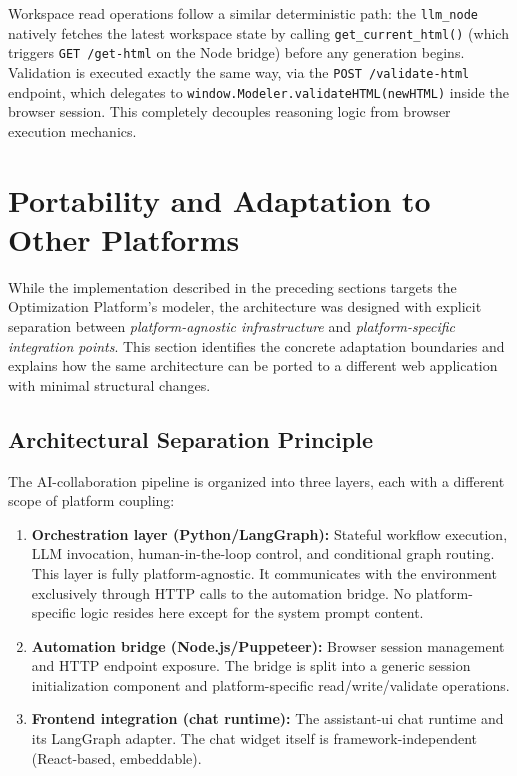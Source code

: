 Workspace read operations follow a similar deterministic path: the \texttt{llm\_node} natively fetches the latest workspace state by calling \texttt{get\_current\_html()} (which triggers \texttt{GET /get-html} on the Node bridge) before any generation begins. Validation is executed exactly the same way, via the \texttt{POST /validate-html} endpoint, which delegates to \texttt{window.Modeler.validateHTML(newHTML)} inside the browser session. This completely decouples reasoning logic from browser execution mechanics.


\section{Portability and Adaptation to Other Platforms}
While the implementation described in the preceding sections targets the Optimization Platform's modeler, the architecture was designed with explicit separation between \emph{platform-agnostic infrastructure} and \emph{platform-specific integration points}. This section identifies the concrete adaptation boundaries and explains how the same architecture can be ported to a different web application with minimal structural changes.

\subsection{Architectural Separation Principle}
The AI-collaboration pipeline is organized into three layers, each with a different scope of platform coupling:

\begin{enumerate}
    \item \textbf{Orchestration layer (Python/LangGraph):} Stateful workflow execution, LLM invocation, human-in-the-loop control, and conditional graph routing. This layer is fully platform-agnostic. It communicates with the environment exclusively through HTTP calls to the automation bridge. No platform-specific logic resides here except for the system prompt content.
    \item \textbf{Automation bridge (Node.js/Puppeteer):} Browser session management and HTTP endpoint exposure. The bridge is split into a generic session initialization component and platform-specific read/write/validate operations.
    \item \textbf{Frontend integration (chat runtime):} The assistant-ui chat runtime and its LangGraph adapter. The chat widget itself is framework-independent (React-based, embeddable). 
\end{enumerate}

